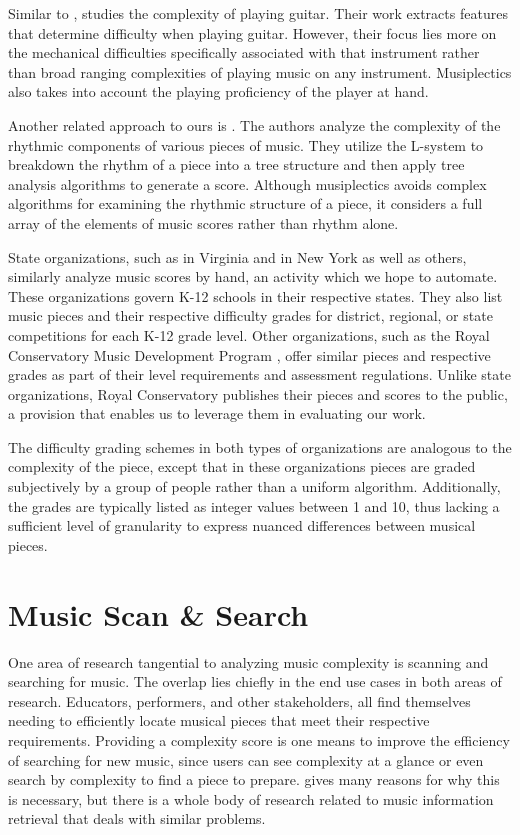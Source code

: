 \documentclass[12pt]{report}
\begin{document}
Similar to \cite{Chiu2012}, \cite{Heijink2002} studies the complexity of playing guitar. Their work extracts features that determine difficulty when playing guitar. However, their focus lies more on the mechanical difficulties specifically associated with that instrument rather than broad ranging complexities of playing music on any instrument. Musiplectics also takes into account the playing proficiency of the player at hand.

Another related approach to ours is \cite{Liou2010}. The authors analyze the complexity of the rhythmic components of various pieces of music. They utilize the L-system to breakdown the rhythm of a piece into a tree structure and then apply tree analysis algorithms to generate a score. Although musiplectics avoids complex algorithms for examining the rhythmic structure of a piece, it considers a full array of the elements of music scores rather than rhythm alone.

State organizations, such as \cite{VBODA} in Virginia and \cite{NYSSMA} in New York as well as others, similarly analyze music scores by hand, an activity which we hope to automate. These organizations govern K-12 schools in their respective states. They also list music pieces and their respective difficulty grades for district, regional, or state competitions for each K-12 grade level. Other organizations, such as the Royal Conservatory Music Development Program \cite{RoyalSyllabus}, offer similar pieces and respective grades as part of their level requirements and assessment regulations. Unlike state organizations, Royal Conservatory publishes their pieces and scores to the public, a provision that enables us to leverage them in evaluating our work.

The difficulty grading schemes in both types of organizations are analogous to the complexity of the piece, except that in these organizations pieces are graded subjectively by a group of people rather than a uniform algorithm. Additionally, the grades are typically listed as integer values between 1 and 10, thus lacking a sufficient level of granularity to express nuanced differences between musical pieces.

\section{Music Scan \& Search}
\label{sec:relscan}

One area of research tangential to analyzing music complexity is scanning and searching for music. The overlap lies chiefly in the end use cases in both areas of research. Educators, performers, and other stakeholders, all find themselves needing to efficiently locate musical pieces that meet their respective requirements. Providing a complexity score is one means to improve the efficiency of searching for new music, since users can see complexity at a glance or even search by complexity to find a piece to prepare. \cite{Byrd2001} gives many reasons for why this is necessary, but there is a whole body of research related to music information retrieval that deals with similar problems.
\end{document}
